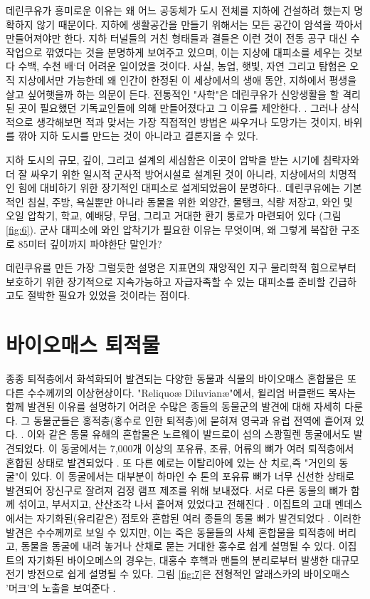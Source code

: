 \documentclass[10pt,twocolumn,letterpaper]{article}
\begin{document}
데린쿠유가 흥미로운 이유는 왜 어느 공동체가 도시 전체를 지하에 건설하려 했는지 명확하지 않기 때문이다. 지하에 생활공간을 만들기 위해서는 모든 공간이 암석을 깍아서 만들어져야만 한다. 지하 터널들의 거친 형태들과 결들은 이런 것이 전동 공구 대신 수작업으로 깎였다는 것을 분명하게 보여주고 있으며, 이는 지상에 대피소를 세우는 것보다 수백, 수천 배`더 어려운 일이었을 것이다. 사실, 농업, 햇빛, 자연 그리고 탐험은 오직 지상에서만  가능한데 왜 인간이 한정된 이 세상에서의 생애 동안, 지하에서 평생을 살고 싶어햇을까 하는 의문이 든다. 전통적인 "사학"은 데린쿠유가 신앙생활을 할 격리된 곳이 필요했던 기독교인들에 의해 만들어졌다고 그 이유를 제안한다. \cite{53}. 그러나 상식적으로 생각해보면 적과 맞서는 가장 직접적인 방법은  싸우거나 도망가는 것이지, 바위를 깎아 지하 도시를 만드는 것이 아니라고 결론지을 수 있다.

지하 도시의 규모, 깊이, 그리고 설계의 세심함은 이곳이 압박을 받는 시기에
 침략자와 더 잘 싸우기 위한 일시적 군사적 방어시설로 설계된 것이 아니라, 지상에서의 치명적인 힘에 대비하기 위한 장기적인 대피소로 설계되었음이 분명하다.. 데린쿠유에는 기본적인 침실, 주방, 욕실뿐만 아니라 동물을 위한 외양간, 물탱크, 식량 저장고, 와인 및 오일 압착기, 학교, 예배당, 무덤, 그리고 거대한 환기 통로가 마련되어 있다 (그림 \ref{fig:6}). 군사 대피소에 와인 압착기가 필요한 이유는 무엇이며, 왜 그렇게 복잡한 구조로 85미터 깊이까지 파야한단 말인가?

데린쿠유를 만든 가장 그럴듯한 설명은 지표면의 재앙적인 지구 물리학적 힘으로부터 보호하기 위한 장기적으로 지속가능하고 자급자족할 수 있는 대피소를 준비할 긴급하고도 절박한 필요가 있었을 것이라는 점이다.

\section{바이오매스 퇴적물}
 
종종 퇴적층에서 화석화되어 발견되는 다양한 동물과 식물의 바이오매스 혼합물은 또 다른 수수께끼의 이상현상이다. "Reliquoæ Diluvianæ"에서, 윌리엄 버클랜드 목사는 함께 발견된 이유를 설명하기 어려운 수많은 종들의 동물군의 발견에 대해 자세히 다룬다. 그 동물군들은 홍적층(홍수로 인한 퇴적층)에 묻혀져 영국과 유럽 전역에 흩어져 있다. \cite{58}. 이와 같은 동물 유해의 혼합물은 노르웨이 발드로이 섬의 스쾅힐렌 동굴에서도 발견되었다. 이 동굴에서는 7,000개 이상의 포유류, 조류, 어류의 뼈가 여러 퇴적층에서 혼합된 상태로 발견되었다 \cite{59}. 또 다른 예로는 이탈리아에 있는 산 치로,즉 "거인의 동굴"이 있다. 이 동굴에서는 대부분이 하마인 수 톤의 포유류 뼈가 너무 신선한 상태로 발견되어 장신구로 잘려져 검정 램프 제조를 위해 보내졌다. 서로 다른 동물의 뼈가 함께 섞이고, 부서지고, 산산조각 나서 흩어져 있었다고 전해진다 \cite{60,61}. 이집트의 고대 멘데스에서는 자기화된(유리같은) 점토와 혼합된 여러 종들의 동물 뼈가 발견되었다 \cite{57}. 이러한 발견은 수수께끼로 보일 수 있지만, 이는 죽은 동물들의 사체 혼합물을 퇴적층에 버리고, 동물을  동굴에 내려 놓거나 산채로 묻는 거대한 홍수로 쉽게 설명될 수 있다. 이집트의 자기화된 바이오메스의 경우는,  대홍수 후핵과 맨틀의 분리로부터 발생한 대규모 전기 방전으로 쉽게 설명될 수 있다. 그림 \ref{fig:7}은 전형적인 알래스카의 바이오매스 '머크'의 노출을 보여준다 \cite{56}.
\end{document}
